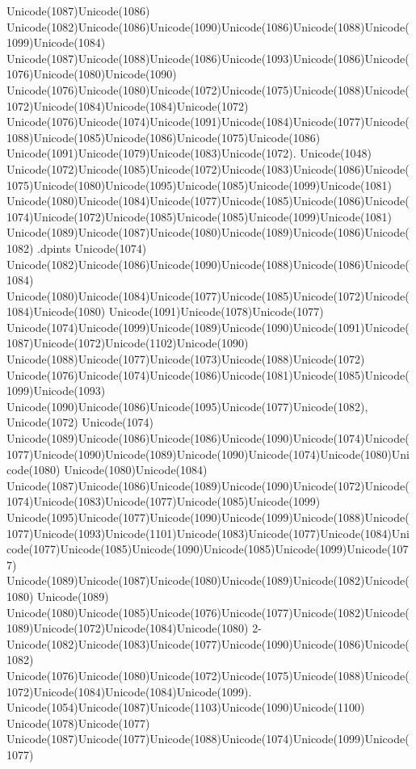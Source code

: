 \documentclass[a4paper,11pt]{report}
\begin{document}
{{Unicode(1087)Unicode(1086)
Unicode(1082)Unicode(1086)Unicode(1090)Unicode(1086)Unicode(1088)Unicode(1099)Unicode(1084)
Unicode(1087)Unicode(1088)Unicode(1086)Unicode(1093)Unicode(1086)Unicode(1076)Unicode(1080)Unicode(1090)
Unicode(1076)Unicode(1080)Unicode(1072)Unicode(1075)Unicode(1088)Unicode(1072)Unicode(1084)Unicode(1084)Unicode(1072)
Unicode(1076)Unicode(1074)Unicode(1091)Unicode(1084)Unicode(1077)Unicode(1088)Unicode(1085)Unicode(1086)Unicode(1075)Unicode(1086)
Unicode(1091)Unicode(1079)Unicode(1083)Unicode(1072). Unicode(1048)
Unicode(1072)Unicode(1085)Unicode(1072)Unicode(1083)Unicode(1086)Unicode(1075)Unicode(1080)Unicode(1095)Unicode(1085)Unicode(1099)Unicode(1081)
Unicode(1080)Unicode(1084)Unicode(1077)Unicode(1085)Unicode(1086)Unicode(1074)Unicode(1072)Unicode(1085)Unicode(1085)Unicode(1099)Unicode(1081)
Unicode(1089)Unicode(1087)Unicode(1080)Unicode(1089)Unicode(1086)Unicode(1082)
.dpints Unicode(1074)
Unicode(1082)Unicode(1086)Unicode(1090)Unicode(1088)Unicode(1086)Unicode(1084)
Unicode(1080)Unicode(1084)Unicode(1077)Unicode(1085)Unicode(1072)Unicode(1084)Unicode(1080)
Unicode(1091)Unicode(1078)Unicode(1077)
Unicode(1074)Unicode(1099)Unicode(1089)Unicode(1090)Unicode(1091)Unicode(1087)Unicode(1072)Unicode(1102)Unicode(1090)
Unicode(1088)Unicode(1077)Unicode(1073)Unicode(1088)Unicode(1072)
Unicode(1076)Unicode(1074)Unicode(1086)Unicode(1081)Unicode(1085)Unicode(1099)Unicode(1093)
Unicode(1090)Unicode(1086)Unicode(1095)Unicode(1077)Unicode(1082),
Unicode(1072) Unicode(1074)
Unicode(1089)Unicode(1086)Unicode(1086)Unicode(1090)Unicode(1074)Unicode(1077)Unicode(1090)Unicode(1089)Unicode(1090)Unicode(1074)Unicode(1080)Unicode(1080)
Unicode(1080)Unicode(1084)
Unicode(1087)Unicode(1086)Unicode(1089)Unicode(1090)Unicode(1072)Unicode(1074)Unicode(1083)Unicode(1077)Unicode(1085)Unicode(1099)
Unicode(1095)Unicode(1077)Unicode(1090)Unicode(1099)Unicode(1088)Unicode(1077)Unicode(1093)Unicode(1101)Unicode(1083)Unicode(1077)Unicode(1084)Unicode(1077)Unicode(1085)Unicode(1090)Unicode(1085)Unicode(1099)Unicode(1077)
Unicode(1089)Unicode(1087)Unicode(1080)Unicode(1089)Unicode(1082)Unicode(1080)
Unicode(1089)
Unicode(1080)Unicode(1085)Unicode(1076)Unicode(1077)Unicode(1082)Unicode(1089)Unicode(1072)Unicode(1084)Unicode(1080)
2-Unicode(1082)Unicode(1083)Unicode(1077)Unicode(1090)Unicode(1086)Unicode(1082)
Unicode(1076)Unicode(1080)Unicode(1072)Unicode(1075)Unicode(1088)Unicode(1072)Unicode(1084)Unicode(1084)Unicode(1099).
Unicode(1054)Unicode(1087)Unicode(1103)Unicode(1090)Unicode(1100)
Unicode(1078)Unicode(1077)
Unicode(1087)Unicode(1077)Unicode(1088)Unicode(1074)Unicode(1099)Unicode(1077)
}}
\end{document}
